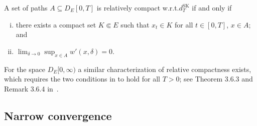 \begin{theorem}\label{prelim:thm:rel-compact-in-SK}
  A set of paths \(A \subseteq D_E[0,T]\) is relatively compact w.r.t.\@ \(d_T^\mathrm{SK}\) if and only if
  \begin{enumerate}[(i)]
    \item there exists a compact set \(K \Subset E\) such that \(x_t \in K\) for all \(t \in [0,T]\), \(x \in A\); and
    \item
          \begin{math}
            \displaystyle \lim_{\delta\to0} \sup_{x \in A} w'(x,\delta) = 0.
          \end{math}
  \end{enumerate}
\end{theorem}

\begin{remark}
  For the space \( D_E[0,\infty) \) a similar characterization of relative compactness exists, which requires the two conditions in  to hold for all \( T > 0 \); see Theorem 3.6.3 and Remark 3.6.4 in~\cite{ethierMarkovProcessesCharacterization1986}.
\end{remark}



\subsection{Narrow convergence}

